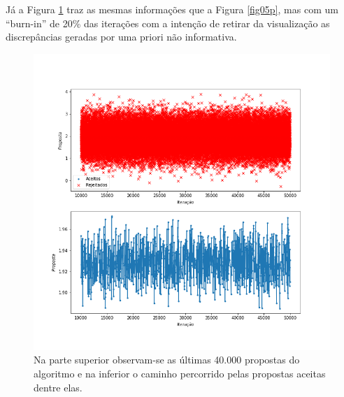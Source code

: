 \documentclass[11pt,letterpaper,twocolumn]{article}
\begin{document}
Já a Figura \ref{fig06p} traz as mesmas informações que a Figura \ref{fig05p}, mas com um ``burn-in'' de 20\% das iterações com a intenção de retirar da visualização as discrepâncias geradas por uma priori não informativa.
\begin{figure}[hbt]
    \centering
    \includegraphics[scale = 0.40, center]{Poisson/fig06 - poisson.png}
    \caption{Na parte superior observam-se as últimas 40.000 propostas do algoritmo e na inferior o caminho percorrido pelas propostas aceitas dentre elas.}
    \label{fig06p}
\end{figure}
\end{document}
